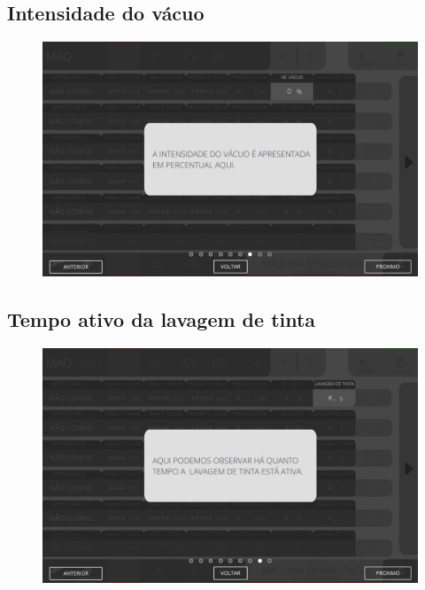 \newpage
\thispagestyle{fancy}
\vspace*{40 pt}
\subsection{Intensidade do vácuo}
\vspace*{\fill}
\begin{figure}[h]
    \centering
    \includegraphics[width=576 px,height=360 px]{src/imagesICV/04-printters/01-printters/settings/7.png}
\end{figure}
\vspace*{\fill}

\newpage
\thispagestyle{fancy}
\vspace*{40 pt}
\subsection{Tempo ativo da lavagem de tinta}
\vspace*{\fill}
\begin{figure}[h]
    \centering
    \includegraphics[width=576 px,height=360 px]{src/imagesICV/04-printters/01-printters/settings/8.png}
\end{figure}
\vspace*{\fill}

